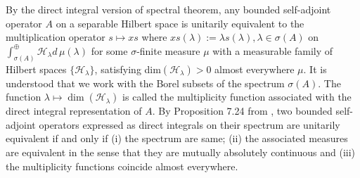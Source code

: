 \documentclass[12pt,a4paper,twoside]{article}
\numberwithin{equation}{section}
\theoremstyle{definition}  %
\theoremstyle{plain}  %
\theoremstyle{remark} %
\begin{document}
By the direct integral version of spectral theorem, any bounded self-adjoint operator $A$ on a separable Hilbert space is unitarily equivalent to the multiplication operator 
 $s\mapsto xs$  where $xs(\lambda) := \lambda s(\lambda ), \lambda \in \sigma(A)$ on $\int_{\sigma(A)}^{\oplus}\mathcal{H}_{\lambda}d\,\mu(\lambda)$ for some $\sigma$-finite measure $\mu$ with a measurable family  of Hilbert spaces $\{\mathcal{H}_{\lambda}\}$, satisfying dim$( \mathcal{H}_{\lambda})>0   $ almost everywhere $\mu .$ It is understood that we work with the Borel subsets of the spectrum $\sigma(A)$.  The function  $\lambda \mapsto \dim (\mathcal{H}_{\lambda})$ is called the multiplicity function associated with the direct integral representation of $A$.
By Proposition 7.24 from \cite{Hall13}, two bounded self-adjoint operators expressed as direct integrals on their spectrum are unitarily equivalent if and only if (i) the spectrum are same; (ii) the associated measures are equivalent in the sense that they are mutually absolutely continuous and (iii) the multiplicity functions coincide almost everywhere.
\end{document}
